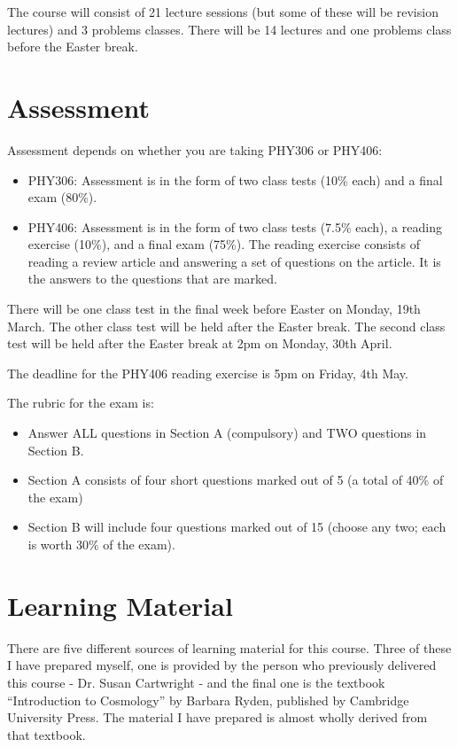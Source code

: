 \documentclass[11pt]{article}
\begin{document}
    The course will consist of 21 lecture sessions (but some of these will be revision lectures) and 3 problems classes. There will be 14 lectures and one problems class before the Easter break. 

    \section{Assessment}
    Assessment depends on whether you are taking PHY306 or PHY406:
    \begin{itemize}
    \item PHY306: Assessment is in the form of two class tests (10\% each) and a final exam (80\%).
    \item PHY406: Assessment is in the form of two class tests (7.5\% each), a reading exercise (10\%), and a final exam (75\%). The reading exercise consists of reading a review article and answering a set of questions on the article. It is the answers to the questions that are marked.
    \end{itemize}

\noindent
 There will be one class test in the final week before Easter on Monday, 19th March. The other class test will be held after the Easter break. The second class test will be held after the Easter break at 2pm on Monday, 30th April.

\noindent
The deadline for the PHY406 reading exercise is 5pm on Friday, 4th May.

\noindent
    The rubric for the exam is: 
    
    \begin{itemize}
        \item Answer ALL questions in Section A (compulsory) and TWO questions in Section B.
        \item Section A consists of four short questions marked out of 5 (a total of 40\% of the exam)
        \item Section B will include four questions marked out of 15 (choose any two; each is worth 30\% of the exam).
    \end{itemize}

    \section{Learning Material}
    There are five different sources of learning material for this course. Three of these I have prepared myself, one is provided by the person who previously delivered this course - Dr. Susan Cartwright - and the final one is the textbook ``Introduction to Cosmology'' by Barbara Ryden, published by Cambridge University Press. The material I have prepared is almost wholly derived from that textbook.
    
\end{document}

